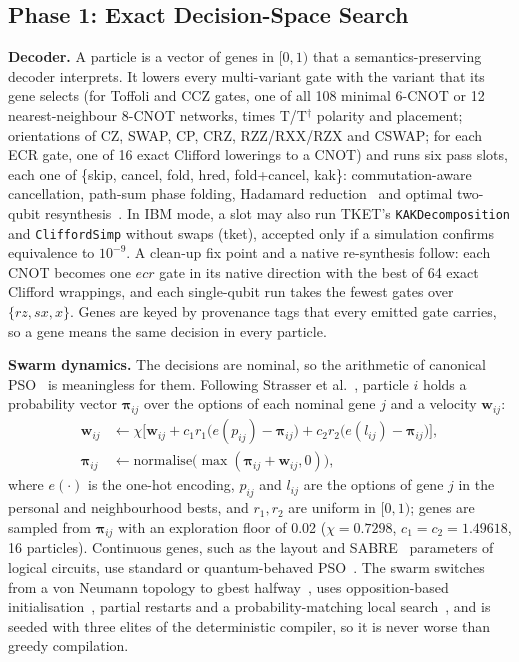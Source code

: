 \documentclass[conference,letterpaper]{IEEEtran}
\newcommand{\tool}[1]{\texttt{#1}}
\begin{document}
\subsection{Phase 1: Exact Decision-Space Search}\label{sec:phase1}
\textbf{Decoder.} A particle is a vector of genes in $[0, 1)$ that a semantics-preserving decoder interprets.
It lowers every multi-variant gate with the variant that its gene selects (for Toffoli and CCZ gates, one of
all 108 minimal 6-CNOT or 12 nearest-neighbour 8-CNOT networks, times T/T$^\dagger$ polarity and placement;
orientations of CZ, SWAP, CP, CRZ, RZZ/RXX/RZX and CSWAP; for each ECR gate, one of 16 exact Clifford
lowerings to a CNOT) and runs six pass slots, each one of \{skip, cancel, fold, hred, fold+cancel, kak\}:
commutation-aware cancellation, path-sum phase folding, Hadamard reduction~\cite{nam2018} and optimal
two-qubit resynthesis~\cite{shende2004}. In IBM mode, a slot may also run TKET's \tool{KAKDecomposition} and
\tool{CliffordSimp} without swaps (tket), accepted only if a simulation confirms equivalence to $10^{-9}$. A
clean-up fix point and a native re-synthesis follow: each CNOT becomes one $ecr$ gate in its native
direction with the best of 64 exact Clifford wrappings, and each single-qubit run takes the fewest gates over
$\{rz, sx, x\}$. Genes are keyed by provenance tags that every emitted gate carries, so a gene means the same
decision in every particle.

\textbf{Swarm dynamics.} The decisions are nominal, so the arithmetic of canonical
PSO~\cite{kennedy1995,clerc2002} is meaningless for them. Following Strasser et al.~\cite{strasser2016},
particle $i$ holds a probability vector $\bm{\pi}_{ij}$ over the options of each nominal gene $j$ and a
velocity $\mathbf{w}_{ij}$:
\begin{align}
\mathbf{w}_{ij} &\leftarrow \chi\bigl[\mathbf{w}_{ij} + c_1 r_1\bigl(e(p_{ij}) - \bm{\pi}_{ij}\bigr)
 + c_2 r_2\bigl(e(l_{ij}) - \bm{\pi}_{ij}\bigr)\bigr],\\
\bm{\pi}_{ij} &\leftarrow \mathrm{normalise}\bigl(\max(\bm{\pi}_{ij} + \mathbf{w}_{ij}, 0)\bigr),
\end{align}
where $e(\cdot)$ is the one-hot encoding, $p_{ij}$ and $l_{ij}$ are the options of gene $j$ in the personal
and neighbourhood bests, and $r_1, r_2$ are uniform in $[0, 1)$; genes are sampled from $\bm{\pi}_{ij}$ with
an exploration floor of 0.02 ($\chi = 0.7298$, $c_1 = c_2 = 1.49618$, 16 particles). Continuous genes, such
as the layout and SABRE~\cite{sabre} parameters of logical circuits, use standard or quantum-behaved
PSO~\cite{sun2004}. The swarm switches from a von Neumann topology to gbest halfway~\cite{kennedy2002}, uses
opposition-based initialisation~\cite{tizhoosh2005}, partial restarts and a probability-matching local
search~\cite{thierens2005}, and is seeded with three elites of the deterministic compiler, so it is never
worse than greedy compilation.
\end{document}
